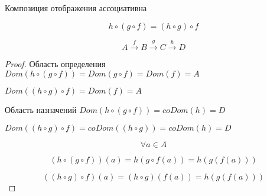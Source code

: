\begin{theorem}{Композиция отображения ассоциативна}

$$h \circ (g \circ f) = (h \circ g) \circ f $$

$$ A \xrightarrow{f} B \xrightarrow{g} C \xrightarrow{h} D$$
\end{theorem}

\begin{proof}
Область определения $Dom(h \circ (g \circ f)) = Dom(g \circ f) = Dom(f) = A$

$Dom((h \circ g) \circ f) = Dom(f) = A$


Область назначений $Dom(h \circ (g \circ f)) = coDom(h) = D$

 $Dom((h \circ g) \circ f) = coDom((h \circ g)) = coDom(h) = D$

 $$\forall a \in A$$

 $$(h \circ (g \circ f))(a) = h(g \circ f(a)) = h(g(f(a)))$$

 $$((h \circ g) \circ f)(a) = (h \circ g)(f(a)) = h(g(f(a)))$$
     
\end{proof}
